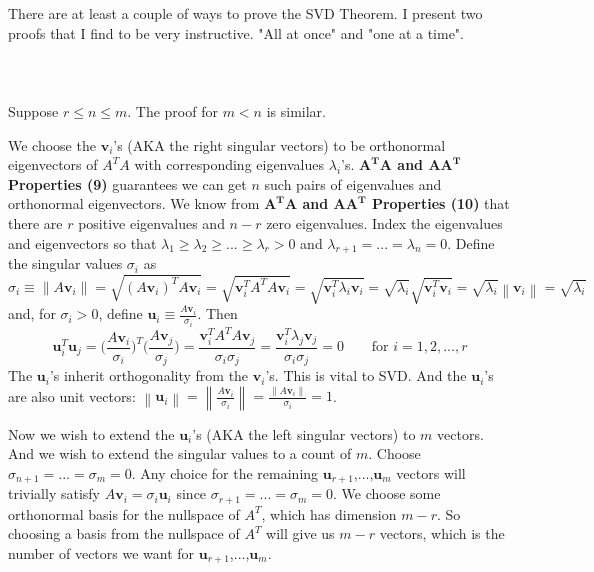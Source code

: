 \documentclass{tufte-handout}
\newcommand{\norm}[1]{\left\lVert#1\right\rVert}
\begin{document}
\noindent There are at least a couple of ways to prove the SVD Theorem. I present two proofs that I find to be very instructive. "All at once" and "one at a time".\\\leavevmode\\

\\\leavevmode\\
\noindent Suppose $r\leq n\leq m$. The proof for $m<n$ is similar.\\\leavevmode

\noindent We choose the $\mathbf{v}_i$'s (AKA the right singular vectors) to be orthonormal eigenvectors of $A^TA$ with corresponding eigenvalues $\lambda_i$'s. \textbf{$\mathbf{A^TA}$ and $\mathbf{AA^T}$ Properties (9)} guarantees we can get $n$ such pairs of eigenvalues and orthonormal eigenvectors. We know from \textbf{$\mathbf{A^TA}$ and $\mathbf{AA^T}$ Properties (10)} that there are $r$ positive eigenvalues and $n-r$ zero eigenvalues. Index the eigenvalues and eigenvectors so that $\lambda_1 \geq \lambda_2 \geq ... \geq \lambda_r > 0$ and $\lambda_{r+1}=...=\lambda_n=0$. Define the singular values $\sigma_{i}$ as
\[
\sigma_{i}\equiv\norm{A\mathbf{v}_i}
=
\sqrt{(A\mathbf{v}_i)^TA\mathbf{v}_i}
=
\sqrt{\mathbf{v}_i^TA^TA\mathbf{v}_i}
=
\sqrt{\mathbf{v}_i^T\lambda_i\mathbf{v}_i}
=
\sqrt{\lambda_i}\sqrt{\mathbf{v}_i^T\mathbf{v}_i}
=
\sqrt{\lambda_i}\norm{\mathbf{v}_i}
=
\sqrt{\lambda_i}\]
and, for $\sigma_{i}>0$, define $\mathbf{u}_i\equiv\frac{A\mathbf{v}_i}{\sigma_{i}}$. Then\\

\[
\mathbf{u}_i^T\mathbf{u}_j=
\Big(\frac{A\mathbf{v}_i}{\sigma_{i}}\Big)^T
\Big(\frac{A\mathbf{v}_j}{\sigma_{j}}\Big)
=
\frac{\mathbf{v}_i^TA^TA\mathbf{v}_j}{\sigma_{i}\sigma_{j}}
=
\frac{\mathbf{v}_i^T\lambda_j\mathbf{v}_j}{\sigma_{i}\sigma_{j}}
=0
~~~~~~~~~
\text{for }i=1,2,...,r
\]
The $\mathbf{u}_i$'s inherit orthogonality from the $\mathbf{v}_i$'s. This is vital to SVD. And the $\mathbf{u}_i$'s are also unit vectors: $\norm{\mathbf{u}_i}=\norm{\frac{A\mathbf{v}_i}{\sigma_{i}}}=\frac{\norm{A\mathbf{v}_i}}{\sigma_{i}}=1$.\\\leavevmode

\noindent Now we wish to extend the $\mathbf{u}_i$'s (AKA the left singular vectors) to $m$ vectors. And we wish to extend the singular values to a count of $m$. Choose $\sigma_{n+1}=...=\sigma_{m}=0$. Any choice for the remaining $\mathbf{u}_{r+1}$,...,$\mathbf{u}_m$ vectors will trivially satisfy $A\mathbf{v}_i=\sigma_{i}\mathbf{u}_i$ since $\sigma_{r+1}=...=\sigma_{m}=0$. We choose some orthonormal basis for the nullspace of $A^T$, which has dimension $m-r$. So choosing a basis from the nullspace of $A^T$ will give us $m-r$ vectors, which is the number of vectors we want for $\mathbf{u}_{r+1}$,...,$\mathbf{u}_m$.\\\leavevmode
\end{document}
